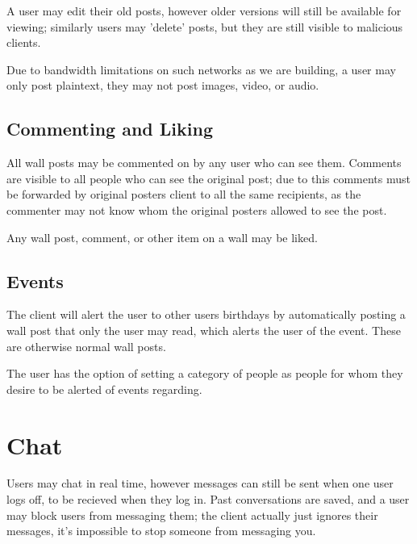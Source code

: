 A user may edit their old posts, however older versions will still be available
for viewing; similarly users may 'delete' posts, but they are still visible to
malicious clients.

Due to bandwidth limitations on such networks as we are building, a user may
only post plaintext, they may not post images, video, or audio.

\subsection{Commenting and Liking}
All wall posts may be commented on by any user who can see them. Comments are
visible to all people who can see the original post; due to this comments must
be forwarded by original posters client to all the same recipients, as the
commenter may not know whom the original posters allowed to see the post.

Any wall post, comment, or other item on a wall may be liked.
    
\subsection{Events}
The client will alert the user to other users birthdays by automatically posting
a wall post that only the user may read, which alerts the user of the event.
These are otherwise normal wall posts.

The user has the option of setting a category of people as people for whom they
desire to be alerted of events regarding.

\section{Chat}
Users may chat in real time, however messages can still be sent when one user
logs off, to be recieved when they log in. Past conversations are saved, and a
user may block users from messaging them; the client actually just ignores their
messages, it's impossible to stop someone from messaging you.
